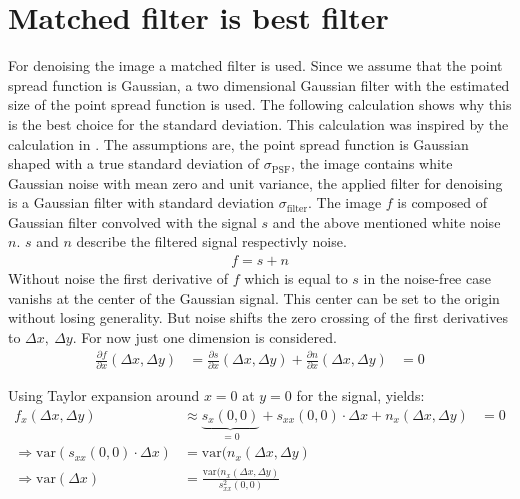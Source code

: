 \section{Matched filter is best filter} \label{detectionError}
For denoising the image a matched filter is used. Since we assume that the point spread function is Gaussian, a two dimensional Gaussian filter with the estimated size of the point spread function is used. The following calculation shows why this is the best choice for the standard deviation.\newline
This calculation was inspired by the calculation in \cite{ulli}.\newline 
The assumptions are, the point spread function is Gaussian shaped with a true standard deviation of $\sigma_\text{PSF}$, the image contains white Gaussian noise with mean zero and unit variance, the applied filter for denoising is a Gaussian filter with standard deviation $\sigma_\text{filter}$.\newline
The image $f$ is composed of Gaussian filter convolved with the signal $s$ and the above mentioned white noise $n$. $s$ and $n$ describe the filtered signal respectivly noise.
\begin{align}
 f=s+n \label{gl91}
\end{align}
Without noise the first derivative of $f$ which is equal to $s$ in the noise-free case vanishs at the center of the Gaussian signal. This center can be set to the origin without losing generality. But noise shifts the zero crossing of the first derivatives to $\Delta x,~\Delta y$. For now just one dimension is considered.
\begin{align}
\frac{\partial f}{\partial x}\left(\Delta x, \Delta y\right) &= \frac{\partial s}{\partial x} \left(\Delta x, \Delta y\right) + \frac{\partial n}{\partial x}\left(\Delta x, \Delta y\right)&=0
\end{align}  

Using Taylor expansion around $x = 0$ at $y= 0$ for the signal, yields:
\begin{align}
f_x(\Delta x, \Delta y)&\approx \underbrace{s_x(0, 0)}_{=0} + s_{xx}(0, 0)\cdot \Delta x + n_x(\Delta x, \Delta y)&=0\\
\Rightarrow \text{var}(s_{xx}(0, 0)\cdot \Delta x)&= \text{var}(n_x(\Delta x,\Delta y)\\
\Rightarrow \text{var}(\Delta x) &= \frac{\text{var}(n_x(\Delta x, \Delta y)}{s_{xx}^2(0, 0)} \label{ch9gl1}
\end{align}

